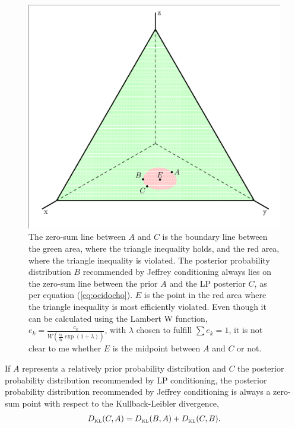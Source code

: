 \documentclass[12pt]{article}
\begin{document}
\begin{figure}[H]
    \begin{minipage}[h]{.7\linewidth}
      \includegraphics[width=\textwidth]{dreieck.eps}
      \caption{\footnotesize The zero-sum line between $A$ and $C$ is
        the boundary line between the green area, where the triangle
        inequality holds, and the red area, where the triangle
        inequality is violated. The posterior probability distribution
        $B$ recommended by Jeffrey conditioning always lies on the
        zero-sum line between the prior $A$ and the LP posterior $C$,
        as per equation (\ref{eq:ocidocho}). $E$ is the point in the
        red area where the triangle inequality is most efficiently
        violated. Even though it can be calculated using the Lambert W
        function,
        $e_{k}=\frac{c_{k}}{W\left(\frac{c_{k}}{a_{k}}\exp(1+\lambda)\right)}$,
        with $\lambda$ chosen to fulfill $\sum{}e_{k}=1$, it is not
        clear to me whether $E$ is the midpoint between $A$ and $C$ or
        not.}
      \label{fig:eugoohue}
\end{minipage}
\end{figure}

\begin{proposition}
    \label{prp:ozohquee}
    If $A$ represents a relatively prior probability distribution and
    $C$ the posterior probability distribution recommended by LP
    conditioning, the posterior probability distribution recommended
    by Jeffrey conditioning is always a zero-sum point with respect to
    the Kullback-Leibler divergence,
\begin{equation}
  \label{eq:ocidocho}
  D_{\mbox{\tiny KL}}(C,A)=D_{\mbox{\tiny KL}}(B,A)+D_{\mbox{\tiny KL}}(C,B).
\end{equation}
\end{proposition}
\end{document}
